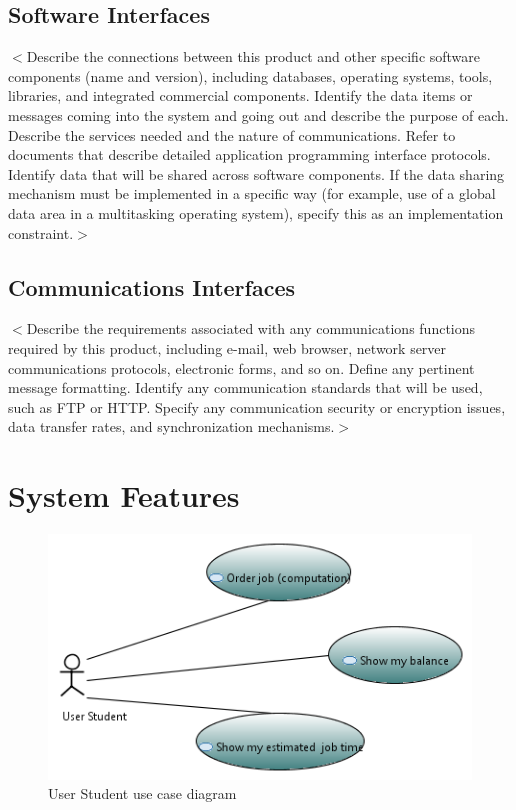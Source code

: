 \documentclass{scrreprt}
\begin{document}
\section{Software Interfaces}
$<$Describe the connections between this product and other specific software 
components (name and version), including databases, operating systems, tools, 
libraries, and integrated commercial components. Identify the data items or 
messages coming into the system and going out and describe the purpose of each.  
Describe the services needed and the nature of communications. Refer to 
documents that describe detailed application programming interface protocols.  
Identify data that will be shared across software components. If the data 
sharing mechanism must be implemented in a specific way (for example, use of a 
global data area in a multitasking operating system), specify this as an 
implementation constraint.$>$

\section{Communications Interfaces}
$<$Describe the requirements associated with any communications functions 
required by this product, including e-mail, web browser, network server 
communications protocols, electronic forms, and so on. Define any pertinent 
message formatting. Identify any communication standards that will be used, such 
as FTP or HTTP. Specify any communication security or encryption issues, data 
transfer rates, and synchronization mechanisms.$>$


\chapter{System Features}


\begin{figure}[h!]
\centering
\includegraphics{modelStudent.png}
\caption{User Student use case diagram}
\end{figure}
\end{document}
